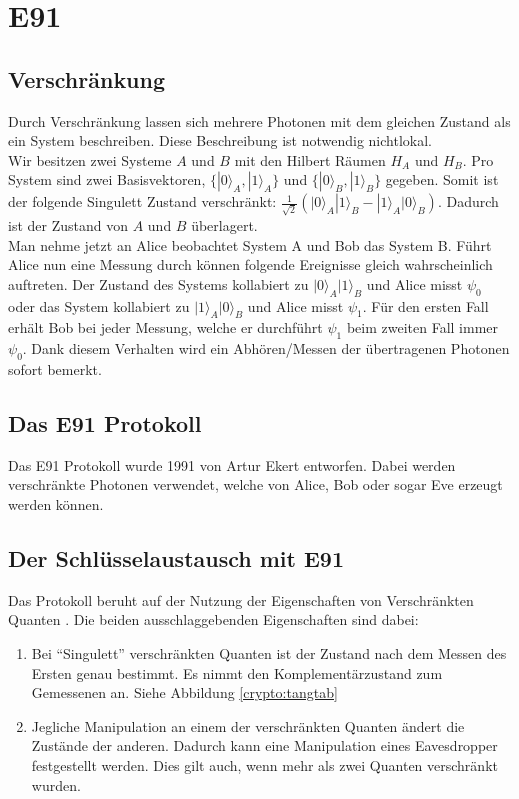 \section{E91}
  \subsection{Verschr\"ankung}
  Durch Verschr\"ankung lassen sich mehrere Photonen mit dem gleichen Zustand als ein System beschreiben. Diese Beschreibung ist notwendig nichtlokal.\\
  	Wir besitzen zwei Systeme $A$ und $B$ mit den Hilbert R\"aumen $H_A$ und $H_B$. Pro System sind zwei Basisvektoren,  $ \{|0\rangle_A,|1\rangle_A\}$ und $\{|0\rangle_B,|1\rangle_B\}$ gegeben. Somit ist der folgende Singulett Zustand verschr\"ankt: $\frac{1}{\sqrt{2}}(\lvert0\rangle_A|1\rangle_B - |1\rangle_A|0\rangle_B) $. Dadurch ist der Zustand von $A$ und $B$ \"uberlagert.\\
	Man nehme jetzt an Alice beobachtet System A und Bob das System B. F\"uhrt Alice nun eine Messung durch k\"onnen folgende Ereignisse gleich wahrscheinlich auftreten. Der Zustand des Systems kollabiert zu $\lvert0\rangle_A|1\rangle_B$ und Alice misst $\psi_0$ oder das System kollabiert zu $\lvert1\rangle_A|0\rangle_B$ und Alice misst $\psi_1$. F\"ur den ersten Fall erh\"alt Bob bei jeder Messung, welche er durchf\"uhrt $\psi_1$ beim zweiten Fall immer $\psi_0$. Dank diesem Verhalten wird ein Abh\"oren/Messen der \"ubertragenen Photonen sofort bemerkt.
  \subsection{Das E91 Protokoll}
  Das E91 Protokoll wurde 1991 von Artur Ekert entworfen.
  Dabei werden verschr\"ankte Photonen verwendet, welche von Alice, Bob oder sogar Eve erzeugt werden k\"onnen.

  \subsection{Der Schl\"usselaustausch mit E91}
  Das Protokoll beruht auf der Nutzung der Eigenschaften von Verschr\"ankten Quanten \cite{qc:verschraenkung}.
  Die beiden ausschlaggebenden Eigenschaften sind dabei:

  \begin{enumerate}
      \item Bei ``Singulett'' verschr\"ankten Quanten ist der Zustand nach dem Messen des Ersten genau bestimmt.
        Es nimmt den Komplement\"arzustand zum Gemessenen an.
        Siehe Abbildung \ref{crypto:tangtab}
      \item Jegliche Manipulation an einem der verschr\"ankten Quanten \"andert die Zust\"ande der anderen.
        Dadurch kann eine Manipulation eines Eavesdropper festgestellt werden.
        Dies gilt auch, wenn mehr als zwei Quanten verschr\"ankt wurden.
  \end{enumerate}

